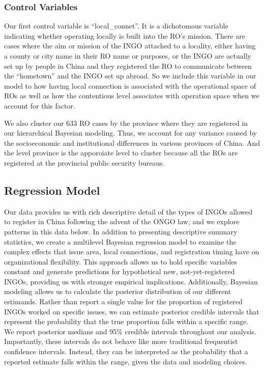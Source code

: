 \documentclass[
]{article}
\begin{document}
\hypertarget{control-variables}{%
\subsubsection{Control Variables}\label{control-variables}}

Our first control variable is ``local\_connet''. It is a dichotomous
variable indicating whether operating locally is built into the RO's
mission. There are cases where the aim or mission of the INGO attached
to a locality, either having a county or city name in their RO name or
purposes, or the INGO are actually set up by people in China and they
registered the RO to communicate between the ``hometown'' and the INGO
set up abroad. So we include this variable in our model to how having
local connection is associated with the operational space of ROs as well
as how the contentious level associates with operation space when we
account for this factor.

We also cluster our 633 RO cases by the province where they are
registered in our hierarchical Bayesian modeling. Thus, we account for
any variance caused by the socioeconomic and institutional differences
in various provinces of China. And the level province is the apporoiate
level to cluster because all the ROs are registered at the provincial
public security bureaus.

\hypertarget{regression-model}{%
\subsection{Regression Model}\label{regression-model}}

Our data provides us with rich descriptive detail of the types of INGOs
allowed to register in China following the advent of the ONGO law, and
we explore patterns in this data below. In addition to presenting
descriptive summary statistics, we create a multilevel Bayesian
regression model to examine the complex effects that issue area, local
connections, and registration timing have on organizational flexibility.
This approach allows us to hold specific variables constant and generate
predictions for hypothetical new, not-yet-registered INGOs, providing us
with stronger empirical implications. Additionally, Bayesian modeling
allows us to calculate the posterior distribution of our different
estimands. Rather than report a single value for the proportion of
registered INGOs worked on specific issues, we can estimate posterior
credible intervals that represent the probability that the true
proportion falls within a specific range. We report posterior medians
and 95\% credible intervals throughout our analysis. Importantly, these
intervals do not behave like more traditional frequentist confidence
intervals. Instead, they can be interpreted as the probability that a
reported estimate falls within the range, given the data and modeling
choices.
\end{document}
